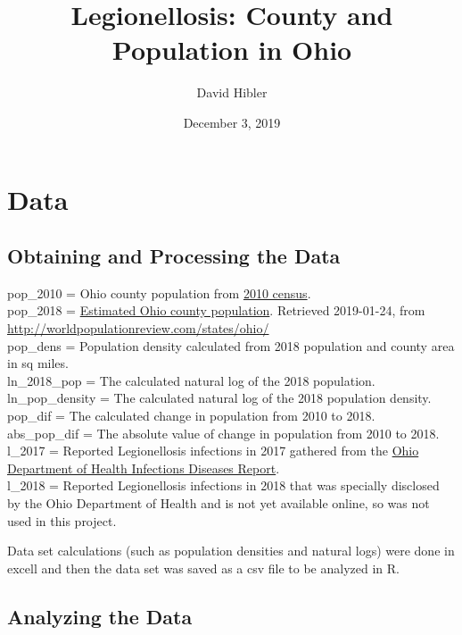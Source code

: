 \documentclass[]{article}
\title{Legionellosis: County and Population in Ohio}
\author{David Hibler}
\date{December 3, 2019}
\begin{document}
\maketitle

\hypertarget{data}{%
\section{Data}\label{data}}

\hypertarget{obtaining-and-processing-the-data}{%
\subsection{Obtaining and Processing the
Data}\label{obtaining-and-processing-the-data}}

pop\_2010 = Ohio county population from
\href{https://www.census.gov/quickfacts/OH}{2010 census}.\\
pop\_2018 =
\href{http://worldpopulationreview.com/states/ohio/}{Estimated Ohio
county population}. Retrieved 2019-01-24, from
\url{http://worldpopulationreview.com/states/ohio/}\\
pop\_dens = Population density calculated from 2018 population and
county area in sq miles.\\
ln\_2018\_pop = The calculated natural log of the 2018 population.\\
ln\_pop\_density = The calculated natural log of the 2018 population
density.\\
pop\_dif = The calculated change in population from 2010 to 2018.\\
abs\_pop\_dif = The absolute value of change in population from 2010 to
2018.\\
l\_2017 = Reported Legionellosis infections in 2017 gathered from the
\href{https://odh.ohio.gov/wps/portal/gov/odh/know-our-programs/infectious-diseases/Reports/2017-annual-summary}{Ohio
Department of Health Infections Diseases Report}.\\
l\_2018 = Reported Legionellosis infections in 2018 that was specially
disclosed by the Ohio Department of Health and is not yet available
online, so was not used in this project.

Data set calculations (such as population densities and natural logs)
were done in excell and then the data set was saved as a csv file to be
analyzed in R.

\hypertarget{analyzing-the-data}{%
\subsection{Analyzing the Data}\label{analyzing-the-data}}
\end{document}
